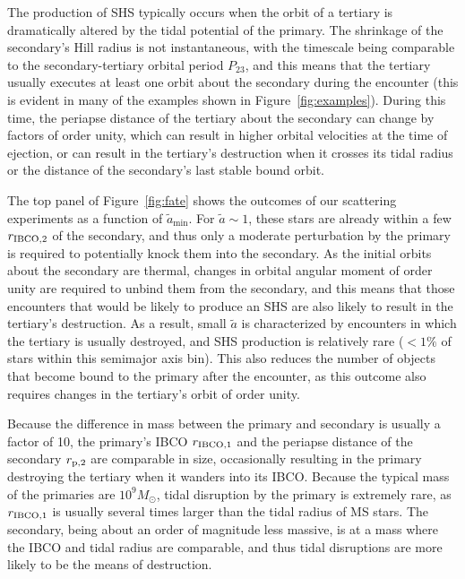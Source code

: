 \documentclass[a4paper,twocolumn]{emulateapj}
\begin{document}
{The production of SHS typically occurs when the orbit of a tertiary is dramatically altered by the tidal potential of the primary. The shrinkage of the secondary's Hill radius is not instantaneous, with the timescale being comparable to the secondary-tertiary orbital period $P_{23}$, and this means that the tertiary usually executes at least one orbit about the secondary during the encounter (this is evident in many of the examples shown in Figure~\ref{fig:examples}). During this time, the periapse distance of the tertiary about the secondary can change by factors of order unity, which can result in higher orbital velocities at the time of ejection, or can result in the tertiary's destruction when it crosses its tidal radius or the distance of the secondary's last stable bound orbit.

The top panel of Figure~\ref{fig:fate} shows the outcomes of our scattering experiments as a function of $\tilde{a}_{\min}$. For $\tilde{a} \sim 1$, these stars are already within a few $r_{\rm IBCO,2}$ of the secondary, and thus only a moderate perturbation by the primary is required to potentially knock them into the secondary. As the initial orbits about the secondary are thermal, changes in orbital angular moment of order unity are required to unbind them from the secondary, and this means that those encounters that would be likely to produce an SHS are also likely to result in the tertiary's destruction. As a result, small $\tilde{a}$ is characterized by encounters in which the tertiary is usually destroyed, and SHS production is relatively rare ($< 1\%$ of stars within this semimajor axis bin). This also reduces the number of objects that become bound to the primary after the encounter, as this outcome also requires changes in the tertiary's orbit of order unity.

Because the difference in mass between the primary and secondary is usually a factor of 10, the primary's IBCO $r_{\rm IBCO,1}$ and the periapse distance of the secondary $r_{\rm p,2}$ are comparable in size, occasionally resulting in the primary destroying the tertiary when it wanders into its IBCO. Because the typical mass of the primaries are $10^{9} M_{\odot}$, tidal disruption by the primary is extremely rare, as $r_{\rm IBCO,1}$ is usually several times larger than the tidal radius of MS stars. The secondary, being about an order of magnitude less massive, is at a mass where the IBCO and tidal radius are comparable, and thus tidal disruptions are more likely to be the means of destruction.

}
\end{document}
